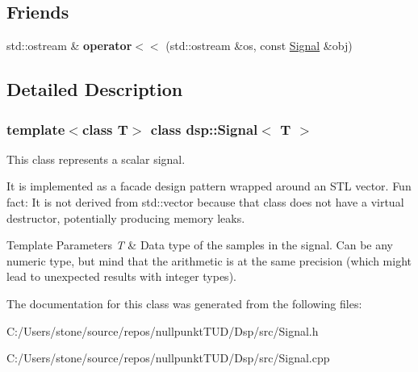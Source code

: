 \subsection*{Friends}
\begin{DoxyCompactItemize}
\item 
\mbox{\label{classdsp_1_1_signal_af0b0d36b0aeab988a05ba360c6ddb89c}} 
std\+::ostream \& {\bfseries operator$<$$<$} (std\+::ostream \&os, const \mbox{\hyperlink{classdsp_1_1_signal}{Signal}} \&obj)
\end{DoxyCompactItemize}


\subsection{Detailed Description}
\subsubsection*{template$<$class T$>$\newline
class dsp\+::\+Signal$<$ T $>$}

This class represents a scalar signal. 

It is implemented as a facade design pattern wrapped around an S\+TL vector. Fun fact\+: It is not derived from std\+::vector because that class does not have a virtual destructor, potentially producing memory leaks. 
\begin{DoxyTemplParams}{Template Parameters}
{\em T} & Data type of the samples in the signal. Can be any numeric type, but mind that the arithmetic is at the same precision (which might lead to unexpected results with integer types). \\
\hline
\end{DoxyTemplParams}


The documentation for this class was generated from the following files\+:\begin{DoxyCompactItemize}
\item 
C\+:/\+Users/stone/source/repos/nullpunkt\+T\+U\+D/\+Dsp/src/Signal.\+h\item 
C\+:/\+Users/stone/source/repos/nullpunkt\+T\+U\+D/\+Dsp/src/Signal.\+cpp\end{DoxyCompactItemize}
